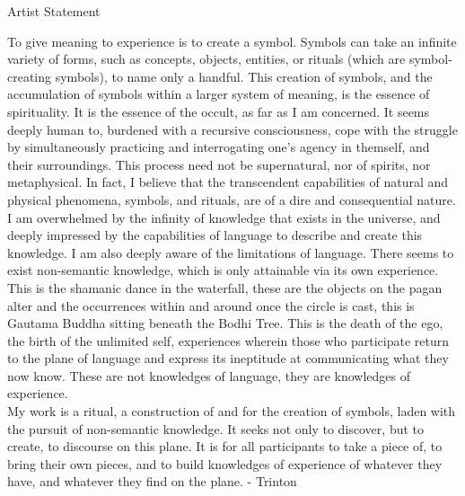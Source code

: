 \documentclass[11pt]{article}
\begin{document}
\vspace*{4\baselineskip}

\begingroup
\begin{center}
\huge Artist Statement
\end{center}
\endgroup

\vspace*{2\baselineskip}

\begingroup
\begin{center}
To give meaning to experience is to create a symbol. Symbols can take an infinite variety of forms, such as concepts, objects, entities, or rituals (which are symbol-creating symbols), to name only a handful. This creation of symbols, and the accumulation of symbols within a larger system of meaning, is the essence of spirituality. It is the essence of the occult, as far as I am concerned. It seems deeply human to, burdened with a recursive consciousness, cope with the struggle by simultaneously practicing and interrogating one's agency in themself, and their surroundings. This process need not be supernatural, nor of spirits, nor metaphysical. In fact, I believe that the transcendent capabilities of natural and physical phenomena, symbols, and rituals, are of a dire and consequential nature. \\ I am overwhelmed by the infinity of knowledge that exists in the universe, and deeply impressed by the capabilities of language to describe and create this knowledge. I am also deeply aware of the limitations of language. There seems to exist non-semantic knowledge, which is only attainable via its own experience. This is the shamanic dance in the waterfall, these are the objects on the pagan alter and the occurrences within and around once the circle is cast, this is Gautama Buddha sitting beneath the Bodhi Tree. This is the death of the ego, the birth of the unlimited self, experiences wherein those who participate return to the plane of language and express its ineptitude at communicating what they now know. These are not knowledges of language, they are knowledges of experience. \\ My work is a ritual, a construction of and for the creation of symbols, laden with the pursuit of non-semantic knowledge. It seeks not only to discover, but to create, to discourse on this plane. It is for all participants to take a piece of, to bring their own pieces, and to build knowledges of experience of whatever they have, and whatever they find on the plane.
\rightskip\leftskip
\phantom{text} \hfill - Trinton
\end{center}
\endgroup
\end{document}
